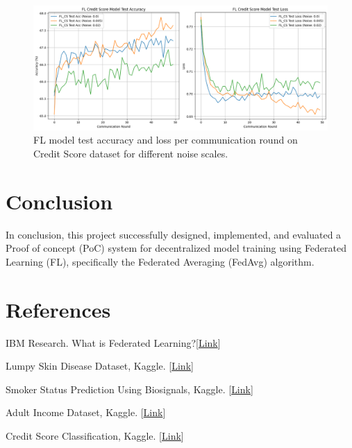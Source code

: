 \documentclass[10pt,twocolumn]{article}
\begin{document}
\begin{figure}[t]
    \centering
    \includegraphics[width=\textwidth]{score.png}
    \caption{FL model test accuracy and loss per communication round on Credit Score dataset for different noise scales.}
    \label{fig:score}


\end{figure}


\section{Conclusion}
In conclusion, this project successfully designed, implemented, and evaluated a Proof of concept (PoC) system for decentralized model training using Federated Learning (FL), specifically the Federated Averaging (FedAvg) algorithm.

\section*{References}
\begin{small}
\begin{enumerate}[label={[{\arabic*}]}]
    \item IBM Research. What is Federated Learning?[\href{https://research.ibm.com/blog/what-is-federated-learning}{Link}]
    
    \item Lumpy Skin Disease Dataset, Kaggle. [\href{https://www.kaggle.com/datasets/saurabhshahane/lumpy-skin-disease-dataset}{Link}]
    
    \item Smoker Status Prediction Using Biosignals, Kaggle. [\href{https://www.kaggle.com/datasets/gauravduttakiit/smoker-status-prediction-using-biosignals}{Link}]
    
    \item Adult Income Dataset, Kaggle. [\href{https://www.kaggle.com/datasets/wenruliu/adult-income-dataset}{Link}]
    
    \item Credit Score Classification, Kaggle. [\href{https://www.kaggle.com/datasets/parisrohan/credit-score-classification}{Link}]
\end{enumerate}
\end{small}
\end{document}
